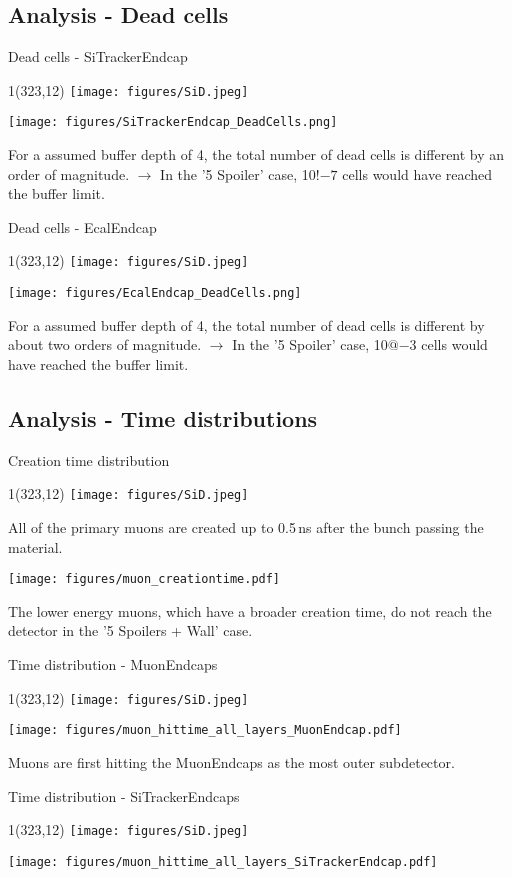 \documentclass[xcolor={dvipsnames}]{beamer}
\newcommand{\sidlogo}{
  \setlength{\TPHorizModule}{1pt}
  \setlength{\TPVertModule}{1pt}
  \begin{textblock}{1}(323,12)
   \texttt{[image: figures/SiD.jpeg]}
  \end{textblock}
  }
\begin{document}
\subsection{Analysis - Dead cells}
\begin{frame}{Dead cells - \small SiTrackerEndcap}
\sidlogo
 \begin{center}
\texttt{[image: figures/SiTrackerEndcap\_DeadCells.png]}
\end{center}
\small For a assumed buffer depth of 4, the total number of dead cells is different by an order of magnitude. $\rightarrow$ In the '5 Spoiler' case, 10$!{-7}$ cells would have reached the buffer limit.
\end{frame}
\begin{frame}{Dead cells - \small EcalEndcap}
\sidlogo
 \begin{center}
\texttt{[image: figures/EcalEndcap\_DeadCells.png]}
\end{center}
\small For a assumed buffer depth of 4, the total number of dead cells is different by about two orders of magnitude. $\rightarrow$ In the '5 Spoiler' case, 10$@{-3}$ cells would have reached the buffer limit.
\end{frame}

\subsection{Analysis - Time distributions}
\begin{frame}{Creation time distribution}
\sidlogo
All of the primary muons are created up to 0.5\,ns after the bunch passing the material.
 \begin{center}
\texttt{[image: figures/muon\_creationtime.pdf]}
\end{center}
The lower energy muons, which have a broader creation time, do not reach the detector in the '5 Spoilers + Wall' case.
\end{frame}
\begin{frame}{Time distribution - \small MuonEndcaps}
\sidlogo
 \begin{center}
\texttt{[image: figures/muon\_hittime\_all\_layers\_MuonEndcap.pdf]}
\end{center}
Muons are first hitting the MuonEndcaps as the most outer subdetector.
\end{frame}
\begin{frame}{Time distribution - \small SiTrackerEndcaps}
\sidlogo
 \begin{center}
\texttt{[image: figures/muon\_hittime\_all\_layers\_SiTrackerEndcap.pdf]}
\end{center}
\end{frame}
\end{document}
